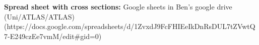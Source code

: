 \documentclass{article}
\begin{document}
\textbf{Spread sheet with cross sections:}
Google sheets in Ben's google drive (Uni/ATLAS/ATLAS)\\ (https://docs.google.com/spreadsheets/d/1ZvxdJ9FcFHIEeIkDnRsDUL7tZVwtQ7-E249czEe7vmM/edit#gid=0)





\newpage

 
\newpage


\newpage


\newpage


\newpage


\newpage



\newpage


\newpage


\newpage


\newpage


\newpage



\end{document}
